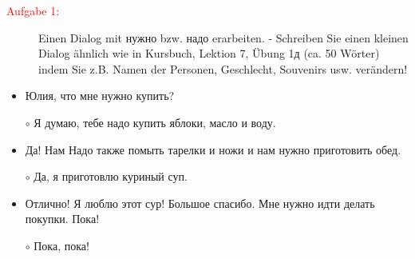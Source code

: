 \documentclass[a4paper]{article}
\theoremstyle{plain}
\begin{document}
\begin{description}
 	\item[\textcolor{red}{Aufgabe 1:}] Einen Dialog mit нужно bzw. надо erarbeiten. - Schreiben Sie einen kleinen Dialog \"ahnlich wie in Kursbuch, Lektion 7, \"Ubung 1д (ca. 50 W\"orter) indem Sie z.B. Namen der Personen, Geschlecht, Souvenirs usw. ver\"andern!  
\end{description}
\vspace*{1cm}

\begin{itemize}
	\item Юлия, что мне нужно купить?
	\item[$\circ$] Я думаю, тебе надо купить яблоки, масло и воду.
	\item Да! Нам Надо также помыть тарелки и ножи и нам нужно приготовить обед.
	\item[$\circ$] Да, я приготовлю куриный суп.
	\item Отлично! Я люблю этот сур! Большое спасибо. Мне нужно идти делать покупки. Пока!
	\item[$\circ$] Пока, пока!
\end{itemize}
\end{document}

